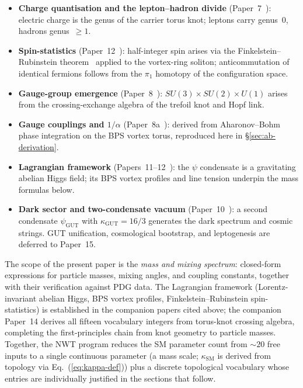 \documentclass[11pt]{article}
\newcommand{\ksm}{\kappa_\text{SM}}
\newcommand{\kgut}{\kappa_\text{GUT}}
\begin{document}
\begin{itemize}
  \item \textbf{Charge quantisation and the lepton--hadron divide}
        (Paper~7~\cite{NWT7}): electric charge is the genus of the
        carrier torus knot; leptons carry genus~$0$, hadrons
        genus~$\geq 1$.
  \item \textbf{Spin-statistics} (Paper~12~\cite{NWT12}): half-integer
        spin arises via the Finkelstein--Rubinstein
        theorem~\cite{FinkelsteinRubinstein1968} applied to the
        vortex-ring soliton; anticommutation of identical fermions
        follows from the $\pi_1$ homotopy of the configuration space.
  \item \textbf{Gauge-group emergence}
        (Paper~8~\cite{NWT8}): $SU(3) \times SU(2) \times U(1)$
        arises from the crossing-exchange algebra of the trefoil knot
        and Hopf link.
  \item \textbf{Gauge couplings and $1/\alpha$}
        (Paper~8a~\cite{NWT8a}): derived from Aharonov--Bohm phase
        integration on the BPS vortex torus, reproduced here in
        \S\ref{sec:ab-derivation}.
  \item \textbf{Lagrangian framework}
        (Papers~11--12~\cite{NWT11,NWT12}): the $\psi$ condensate is
        a gravitating abelian Higgs field; its BPS vortex profiles
        and line tension underpin the mass formulas below.
  \item \textbf{Dark sector and two-condensate vacuum}
        (Paper~10~\cite{NWT10}): a second condensate $\psi_\text{GUT}$
        with $\kgut = 16/3$ generates the dark spectrum and cosmic
        strings.  GUT unification, cosmological bootstrap, and
        leptogenesis are deferred to Paper~15.
\end{itemize}

The scope of the present paper is the \emph{mass and mixing
spectrum}: closed-form expressions for particle masses, mixing
angles, and coupling constants, together with their verification
against PDG data.  The Lagrangian framework (Lorentz-invariant
abelian Higgs, BPS vortex profiles, Finkelstein--Rubinstein
spin-statistics) is established in the companion papers cited
above; the companion Paper~14 derives all fifteen vocabulary
integers from torus-knot crossing algebra, completing the
first-principles chain from knot geometry to particle masses.
Together, the NWT program reduces the SM parameter count
from $\sim 20$ free inputs to a single continuous parameter (a mass
scale; $\ksm$ is derived from topology via
Eq.~(\ref{eq:kappa-def})) plus a discrete topological vocabulary
whose entries are individually justified in the sections that
follow.
\end{document}
